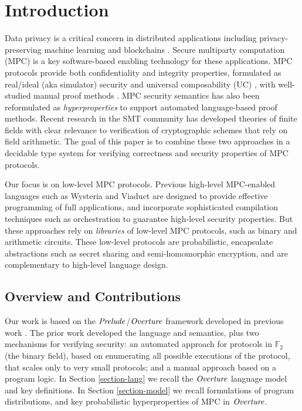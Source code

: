 \section{Introduction}

Data privacy is a critical concern in distributed applications
including privacy-preserving machine learning
\cite{li2021privacy,knott2021crypten,koch2020privacy,liu2020privacy}
and blockchains
\cite{ishai2009zero,lu2019honeybadgermpc,gao2022symmeproof,tomaz2020preserving}.
Secure multiparty computation (MPC) is a key software-based enabling
technology for these applications. MPC protocols provide both confidentiality
and integrity properties, formulated as real/ideal (aka simulator)
security and universal composability (UC) \cite{evans2018pragmatic},
with well-studied manual proof methods \cite{Lindell2017}.  MPC
security semantics has also been reformulated as
\emph{hyperproperties}
\cite{8429300,10.1145/3453483.3454074,skalka-near-ppdp24} to support
automated language-based proof methods. Recent research in the SMT
community has developed theories of finite fields \cite{SMFF} with
clear relevance to verification of cryptographic schemes that rely on
field arithmetic. The goal of this paper is to combine these two
approaches in a decidable type system for verifying correctness and
security properties of MPC protocols.

Our focus is on low-level MPC protocols. Previous high-level
MPC-enabled languages such as Wysteria \cite{rastogi2014wysteria} and
Viaduct \cite{10.1145/3453483.3454074} are designed to provide
effective programming of full applications, and incorporate
sophisticated compilation techniques such as orchestration
\cite{viaduct-UC} to guarantee high-level security properties. But
these approaches rely on \emph{libraries} of low-level MPC protocols,
such as binary and arithmetic circuits. These low-level protocols are
probabilistic, encapsulate abstractions such as secret sharing and
semi-homomorphic encryption, and are complementary to high-level
language design.

\subsection{Overview and Contributions}

Our work is based on the $\mathit{Prelude}$/$\mathit{Overture}$ framework developed in
previous work \cite{skalka-near-ppdp24}. The prior work developed the 
language and semantics, plus two mechanisms for verifying security: an
automated approach for protocols in $\mathbb{F}_2$ (the binary field),
based on enumerating all possible executions of the protocol, that scales 
only to very small protocols; and a manual approach based on a program logic.
%
In Section \ref{section-lang} we recall the $\mathit{Overture}$ language model and key definitions. In
Section \ref{section-model} we recall formulations of program distributions,
and key probabilistic hyperproperties of MPC in $\mathit{Overture}$. 

